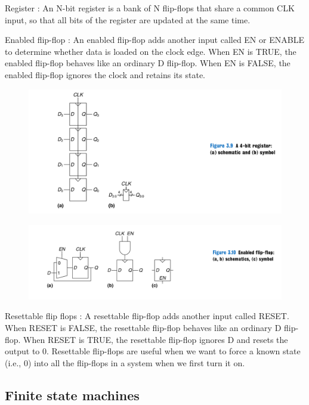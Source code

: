 \documentclass{article}[12pt]
\begin{document}
Register : An N-bit register is a bank of N flip-flops that share a common CLK
input, so that all bits of the register are updated at the same time.

Enabled flip-flop : An enabled flip-flop adds another input called EN or ENABLE to
determine whether data is loaded on the clock edge. When EN is
TRUE, the enabled flip-flop behaves like an ordinary D flip-flop.
When EN is FALSE, the enabled flip-flop ignores the clock and
retains its state.

\begin{figure}[htbp]
\centerline{\includegraphics[scale=0.3]{../Images/4-bit-reg.png}}
\end{figure}

\begin{figure}[htbp]
\centerline{\includegraphics[scale=0.3]{../Images/enabled-flip-flop.png}}
\end{figure}

Resettable flip flops : A resettable flip-flop adds another input called RESET. When RESET
is FALSE, the resettable flip-flop behaves like an ordinary D flip-flop.
When RESET is TRUE, the resettable flip-flop ignores D and resets the
output to 0. Resettable flip-flops are useful when we want to force a
known state (i.e., 0) into all the flip-flops in a system when we first
turn it on.

\subsection{Finite state machines}
\end{document}
